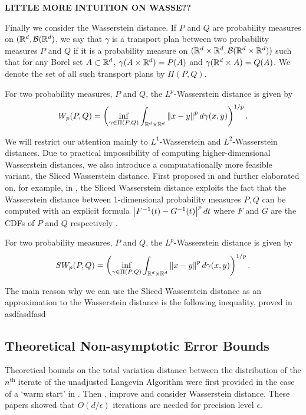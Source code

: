 \textbf{LITTLE MORE INTUITION ON WASSE??}

Finally we consider the Wasserstein distance.  If $P$ and $Q$ are probability measures on $(\mathbb{R}^d,\mathcal{B}(\mathbb{R}^d)$, we say that $\gamma$ is a transport plan between two probability measures $P$ and $Q$ if it is a probability measure on $(\mathbb{R}^d \times \mathbb{R}^d, \mathcal{B}(\mathbb{R}^d \times \mathbb{R}^d))$ such that for any Borel set $A \subset \mathbb{R}^d$, $\gamma(A \times \mathbb{R}^d)=P(A)$ and $\gamma(\mathbb{R}^d \times A) = Q(A)$.  We denote the set of all such transport plans by $\Pi(P,Q)$.

\begin{defn}
For two probability measures, $P$ and $Q$, the $L^p$-Wasserstein distance is given by
$$
W_p(P,Q) = \left( \inf_{\gamma \in \Pi(P,Q)} \int_{\R^d \times \R^d} \norm{x-y}^p d \gamma(x,y) \right)^{1/p}.
$$
\end{defn}

We will restrict our attention mainly to $L^1$-Wasserstein and $L^2$-Wasserstein distances. Due to practical impossibility of computing higher-dimensional Wasserstein distances, we also introduce a compuatationally more feasible variant, the Sliced Wasserstein distance. First proposed in \cite{rabin2011wasserstein} and further elaborated on, for example, in \cite{gswd}, the Sliced Wasserstein distance exploits the fact that the Wasserstein distance between 1-dimensional probability measures $P, Q$ can be computed with an explicit formula $\abs{F^{-1}(t)-G^{-1}(t)}^p dt$ where $F$ and $G$ are the CDFs of $P$ and $Q$ respectively \cite{ramdas2017wasserstein}.


\begin{defn}
For two probability measures, $P$ and $Q$, the $L^p$-Wasserstein distance is given by
$$
SW_p(P,Q) = \left( \inf_{\gamma \in \Pi(P,Q)} \int_{\R^d \times \R^d} \norm{x-y}^p d \gamma(x,y) \right)^{1/p}.
$$
\end{defn}

The main reason why we can use the Sliced Wasserstein distance as an approximation to the Wasserstein distance is the following inequality, proved in asdfasdfasd 


\subsection{Theoretical Non-asymptotic Error Bounds}
Theoretical bounds on the total variation distance between the distribution of the $n^\text{th}$ iterate of the unadjusted Langevin Algorithm were first provided in the case of a `warm start' in \cite{dalalyan2017theoretical}.  Then \cite{durmus2016high}, \cite{durmus2017nonasymptotic} improve and consider Wasserstein distance.  These papers showed that $O(d/\epsilon)$ iterations are needed for precision level $\epsilon$.

